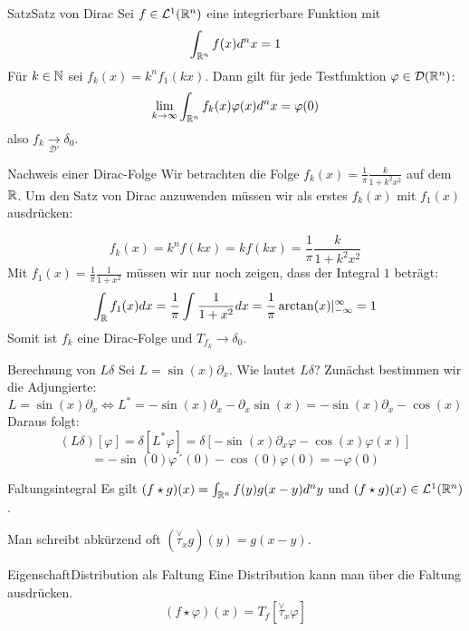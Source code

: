 \begin{Satz}{Satz}{Satz von Dirac}
    Sei $f\in \mathcal{L}^1(\mathbb{R}^n)$ eine integrierbare Funktion mit
    $$\int_{\mathbb{R}^n}f(x)d^nx=1$$
    Für $k\in \mathbb{N}$ sei $f_k(x)=k^nf_1(kx)$. Dann gilt für jede Testfunktion $\varphi\in \mathcal{D}(\mathbb{R}^n)$:
    $$\lim_{k\rightarrow \infty}\int_{\mathbb{R}^n}f_k(x)\varphi(x)d^nx = \varphi(0)$$
    also $f_k\underset{\mathcal{D}'}{\rightarrow}\delta_0$.
\end{Satz}
\begin{Beispiel}{Nachweis einer Dirac-Folge}
Wir betrachten die Folge $f_k(x)=\frac{1}{\pi}\frac{k}{1+k^2x^2}$ auf dem $\mathbb{R}$. Um den Satz von Dirac anzuwenden müssen wir als erstes $f_k(x)$ mit $f_1(x)$ ausdrücken:

$$f_k(x)=k^n f(kx) = kf(kx) = \frac{1}{\pi}\frac{k}{1+k^2x^2}$$
Mit $f_1(x)=\frac{1}{\pi}\frac{1}{1+x^2}$ müssen wir nur noch zeigen, dass der Integral $1$ beträgt:
$$\int_{\mathbb{R}} f_1(x) dx = \frac{1}{\pi}\int\frac{1}{1+x^2}dx = \frac{1}{\pi}\arctan(x)|_{-\infty}^{\infty}=1$$
Somit ist $f_k$ eine Dirac-Folge und $T_{f_k}\rightarrow \delta_0$.
\end{Beispiel}
\begin{Beispiel}{Berechnung von $L\delta$}
    Sei $L=\sin(x)\partial_x$. Wie lautet $L\delta$? Zunächst bestimmen wir die Adjungierte:
    $$L=\sin(x)\partial_x\iff L^*=-\sin(x)\partial_x-\partial_x\sin(x)=-\sin(x)\partial_x-\cos(x)$$
    Daraus folgt:
    $$(L\delta)[\varphi]=\delta[L^*\varphi]=\delta[-\sin(x)\partial_x\varphi-\cos(x)\varphi(x)]$$
    $$=-\sin(0)\varphi´(0)-\cos(0)\varphi(0)=-\varphi(0)$$
\end{Beispiel}
\begin{Def}{Faltungsintegral}
    Es gilt $(f\star g)(x)=\int_{\mathbb{R}^n}f(y)g(x-y)d^ny$ und $(f\star g)(x)\in \mathcal{L}^1(\mathbb{R}^n)$.
\end{Def}
Man schreibt abkürzend oft $(\overset{\lor}{\tau}_x g)(y)=g(x-y)$.
\begin{Satz}{Eigenschaft}{Distribution als Faltung}
Eine Distribution kann man über die Faltung ausdrücken.
$$(f\star \varphi)(x)=T_f[\overset{\lor}{\tau}_x \varphi]$$
\end{Satz}
